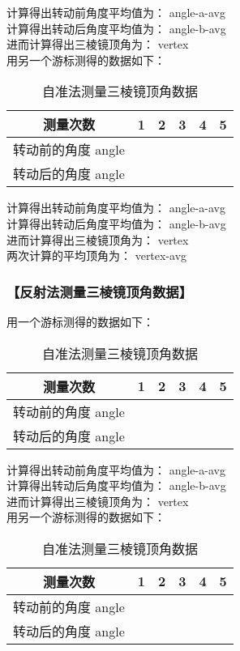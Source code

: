 \documentclass{ctexart}
\let\oldsubsubsection\subsubsection
\renewcommand{\subsubsection}[1]{\oldsubsubsection{\!\!\!\!\!\!【#1】}}
\begin{document}
计算得出转动前角度平均值为：{{ angle-a-avg }} \\
计算得出转动后角度平均值为：{{ angle-b-avg }} \\
进而计算得出三棱镜顶角为：{{ vertex }} \\

用另一个游标测得的数据如下：

\begin{table}[H]
  \centering
  \begin{tabular}{|c|c|c|c|c|c|}
    \hline
     测量次数           & 1 & 2 & 3 & 4 & 5 \\\hline
     转动前的角度 {{ angle }}\\\hline
     转动后的角度 {{ angle }}\\\hline
  \end{tabular}
  \caption{自准法测量三棱镜顶角数据}
\end{table}

计算得出转动前角度平均值为：{{ angle-a-avg }} \\
计算得出转动后角度平均值为：{{ angle-b-avg }} \\
进而计算得出三棱镜顶角为：{{ vertex }} \\
两次计算的平均顶角为：{{ vertex-avg }}

\subsubsection{反射法测量三棱镜顶角数据}

用一个游标测得的数据如下：

\begin{table}[H]
  \centering
  \begin{tabular}{|c|c|c|c|c|c|}
    \hline
     测量次数           & 1 & 2 & 3 & 4 & 5 
     \\\hline
     转动前的角度 {{ angle }}\\\hline
     转动后的角度 {{ angle }}\\\hline
  \end{tabular}
  \caption{自准法测量三棱镜顶角数据}
\end{table}

计算得出转动前角度平均值为：{{ angle-a-avg }} \\
计算得出转动后角度平均值为：{{ angle-b-avg }} \\
进而计算得出三棱镜顶角为：{{ vertex }} \\

用另一个游标测得的数据如下：

\begin{table}[H]
  \centering
  \begin{tabular}{|c|c|c|c|c|c|}
    \hline
     测量次数           & 1 & 2 & 3 & 4 & 5 \\\hline
     转动前的角度 {{ angle }}\\\hline
     转动后的角度 {{ angle }}\\\hline
  \end{tabular}
  \caption{自准法测量三棱镜顶角数据}
\end{table}
\end{document}
